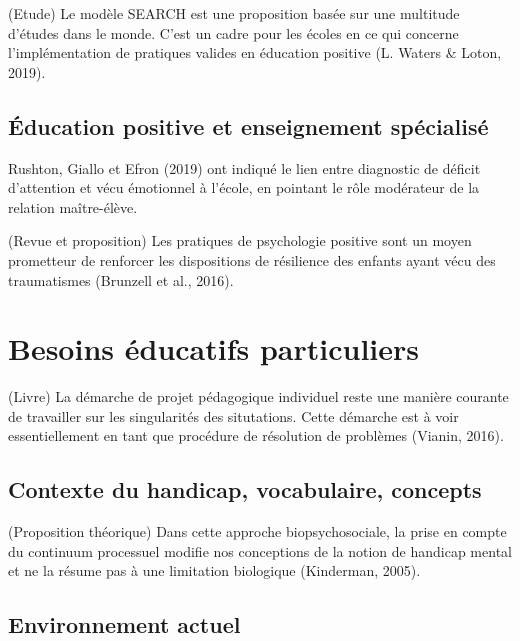 \documentclass[
  french,
]{article}
\begin{document}
(Etude) Le modèle SEARCH est une proposition basée sur une multitude d'études dans le monde. C'est un cadre pour les écoles en ce qui concerne l'implémentation de pratiques valides en éducation positive (L. Waters \& Loton, 2019).

\hypertarget{uxe9ducation-positive-et-enseignement-spuxe9cialisuxe9}{%
\subsection{Éducation positive et enseignement spécialisé}\label{uxe9ducation-positive-et-enseignement-spuxe9cialisuxe9}}

Rushton, Giallo et Efron (2019) ont indiqué le lien entre diagnostic de déficit d'attention et vécu émotionnel à l'école, en pointant le rôle modérateur de la relation maître-élève.

(Revue et proposition) Les pratiques de psychologie positive sont un moyen prometteur de renforcer les dispositions de résilience des enfants ayant vécu des traumatismes (Brunzell et al., 2016).

\hypertarget{besoins-uxe9ducatifs-particuliers}{%
\section{Besoins éducatifs particuliers}\label{besoins-uxe9ducatifs-particuliers}}

(Livre) La démarche de projet pédagogique individuel reste une manière courante de travailler sur les singularités des situtations. Cette démarche est à voir essentiellement en tant que procédure de résolution de problèmes (Vianin, 2016).

\hypertarget{contexte-du-handicap-vocabulaire-concepts}{%
\subsection{Contexte du handicap, vocabulaire, concepts}\label{contexte-du-handicap-vocabulaire-concepts}}

(Proposition théorique) Dans cette approche biopsychosociale, la prise en compte du continuum processuel modifie nos conceptions de la notion de handicap mental et ne la résume pas à une limitation biologique (Kinderman, 2005).

\hypertarget{environnement-actuel}{%
\subsection{Environnement actuel}\label{environnement-actuel}}
\end{document}

